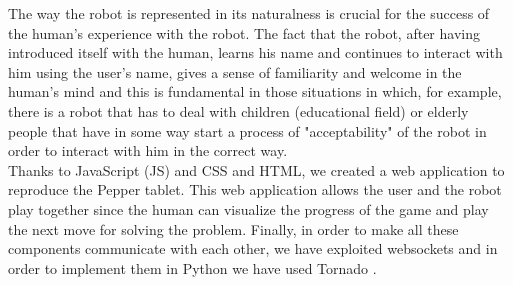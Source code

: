 \documentclass{article}
\begin{document}
\noindent The way the robot is represented in its naturalness is crucial for the success of the human's experience with the robot. The fact that the robot, after having introduced itself with the human, learns his name and continues to interact with him using the user's name, gives a sense of familiarity and welcome in the human's mind and this is fundamental in those situations in which, for example, there is a robot that has to deal with children (educational field) or elderly people that have in some way start a process of "acceptability" of the robot in order to interact with him in the correct way.\\ 
\indent Thanks to JavaScript (JS) and CSS and HTML, we created a web application to reproduce the Pepper tablet. This web application allows the user and the robot play together since the human can visualize the progress of the game and play the next move for solving the problem. Finally, in order to make all these components communicate with each other, we have exploited websockets and in order to implement them in Python we have used Tornado \cite{tornado}. 
\end{document}
